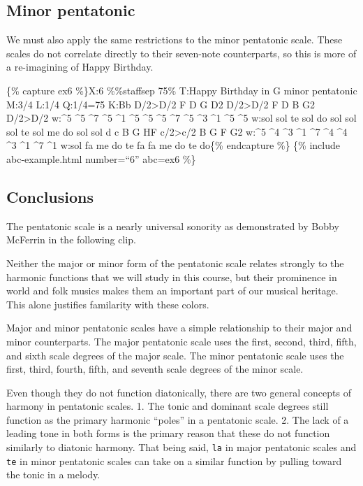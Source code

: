 \documentclass{book}
\begin{document}
\hypertarget{minor-pentatonic}{%
\subsection{Minor pentatonic}\label{minor-pentatonic}}

We must also apply the same restrictions to the minor pentatonic scale. These
scales do not correlate directly to their seven-note counterparts, so this is
more of a re-imagining of Happy Birthday.

\{\% capture ex6 \%\}X:6 \%\%staffsep 75\% T:Happy Birthday in G minor
pentatonic M:3/4 L:1/4 Q:1/4=75 K:Bb D/2\textgreater D/2\textbar{} F D
G\textbar{} D2 D/2\textgreater D/2\textbar{} F D B\textbar{} G2
D/2\textgreater D/2\textbar{} w:\^{}5 \^{}5 \^{}7 \^{}5 \^{}1 \^{}5 \^{}5
\^{}5 \^{}7 \^{}5 \^{}3 \^{}1 \^{}5 \^{}5 w:sol sol te sol do sol sol sol te
sol me do sol sol d c B\textbar{} G HF c/2\textgreater c/2\textbar{} B G
F\textbar{} G2\textbar{]} w:\^{}5 \^{}4 \^{}3 \^{}1 \^{}7 \^{}4 \^{}4 \^{}3
\^{}1 \^{}7 \^{}1 w:sol fa me do te fa fa me do te do\{\% endcapture \%\} \{\%
include abc-example.html number=``6'' abc=ex6 \%\}

\hypertarget{conclusions-37}{%
\subsection{Conclusions}\label{conclusions-37}}

The pentatonic scale is a nearly universal sonority as demonstrated by Bobby
McFerrin in the following clip.

Neither the major or minor form of the pentatonic scale relates strongly to
the harmonic functions that we will study in this course, but their prominence
in world and folk musics makes them an important part of our musical heritage.
This alone justifies familarity with these colors.

Major and minor pentatonic scales have a simple relationship to their major
and minor counterparts. The major pentatonic scale uses the first, second,
third, fifth, and sixth scale degrees of the major scale. The minor pentatonic
scale uses the first, third, fourth, fifth, and seventh scale degrees of the
minor scale.

Even though they do not function diatonically, there are two general concepts
of harmony in pentatonic scales. 1. The tonic and dominant scale degrees still
function as the primary harmonic ``poles'' in a pentatonic scale. 2. The lack
of a leading tone in both forms is the primary reason that these do not
function similarly to diatonic harmony. That being said, \texttt{la} in major
pentatonic scales and \texttt{te} in minor pentatonic scales can take on a
similar function by pulling toward the tonic in a melody.
\end{document}
